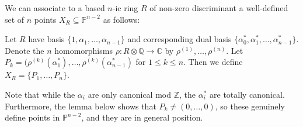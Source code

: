 \documentclass{report}
\begin{document}
We can associate to a based $n$-ic ring $R$ of non-zero discriminant a well-defined set of $n$ points $X_R \subseteq \mathbb{P}^{n-2}$ as follows:

\begin{definition} \label{X_R def}
Let $R$ have basis $\{1,\alpha_1,\ldots,\alpha_{n-1} \}$ and corresponding dual basis $\{ \alpha_0^*, \alpha_1^*, \ldots, \alpha_{n-1}^* \}$.  Denote the $n$ homomorphisms $\rho : R \otimes \mathbb{Q} \to \mathbb{C}$ by $\rho^{(1)},\ldots,\rho^{(n)}$.  Let $P_k = (\rho^{(k)}(\alpha_1^*),\ldots,\rho^{(k)}(\alpha_{n-1}^*)$ for $1 \leq k \leq n$.  Then we define $X_R = \{ P_1,\ldots,P_n \}$.
\end{definition}

Note that while the $\alpha_i$ are only canonical mod $\mathbb{Z}$, the $\alpha_i^*$ are totally canonical.  Furthermore, the lemma below shows that $P_k \neq (0,\ldots,0)$, so these genuinely define points in $\mathbb{P}^{n-2}$, and they are in general position.
\end{document}
